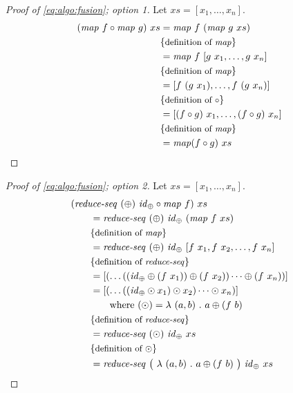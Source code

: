 \begin{proof}[Proof of \autoref{eq:algo:fusion}; option 1]
  Let $xs = [x_1, \ldots, x_n]$.
  \begin{align*}
    (\text{\textit{map}}\ f\circ \text{\textit{map}}\ g)\ xs
      &= \text{\textit{map}}\ f\ (\text{\textit{map}}\ g\ xs)\\
      &\{\text{\small definition of \text{\textit{map}}}\}\\
      &= \text{\textit{map}}\ f\ [g\ x_1, \ldots, g\ x_n]\\
      &\{\text{\small definition of \text{\textit{map}}}\}\\
      &= [f\ (g\ x_1), \ldots, f\ (g\ x_n)]\\
      &\{\text{\small definition of $\circ$}\}\\
      &= [(f\circ g)\ x_1, \ldots, (f\circ g)\ x_n]\\
      &\{\text{\small definition of \text{\textit{map}}}\}\\
      &= \text{\textit{map}} (f\circ g)\ xs
  \end{align*}
\end{proof}
\begin{proof}[Proof of \autoref{eq:algo:fusion}; option 2]
  Let $xs = [x_1, \ldots, x_n]$.
  \begin{align*}
    &(\reduceSeq\ (\oplus)\ \id_\oplus \circ \map\ f)\ xs\\
    &\qquad = \reduceSeq\ (\oplus)\ \id_\oplus\ (\map\ f\ xs)\\
    &\qquad \comment{definition of \map}\\
    &\qquad = \reduceSeq\ (\oplus)\ \id_\oplus\ [f\ x_1, f\ x_2, \ldots, f\ x_n]\\
    &\qquad \comment{definition of \reduceSeq}\\
    &\qquad = [ (\dots ((\id_\oplus \oplus (f\ x_1)) \oplus (f\ x_2)) \dots \oplus (f\ x_n)) ]\\
    &\qquad = [ (\dots ((\id_\oplus \odot x_1) \odot x_2) \dots \odot x_n) ]\\
    &\qquad\qquad \text{where } (\odot) = \lambda\ (a,b)\ .\ a \oplus (f\ b)\\
    &\qquad \comment{definition of \reduceSeq}\\
    &\qquad = \reduceSeq\ (\odot)\ \id_\oplus\ xs\\
    &\qquad \comment{definition of $\odot$}\\
    &\qquad = \reduceSeq\ \big(\ \lambda\ (a,b)\ .\ a \oplus (f\ b)\ \big)\ \id_\oplus\ xs
  \end{align*}
\end{proof}










